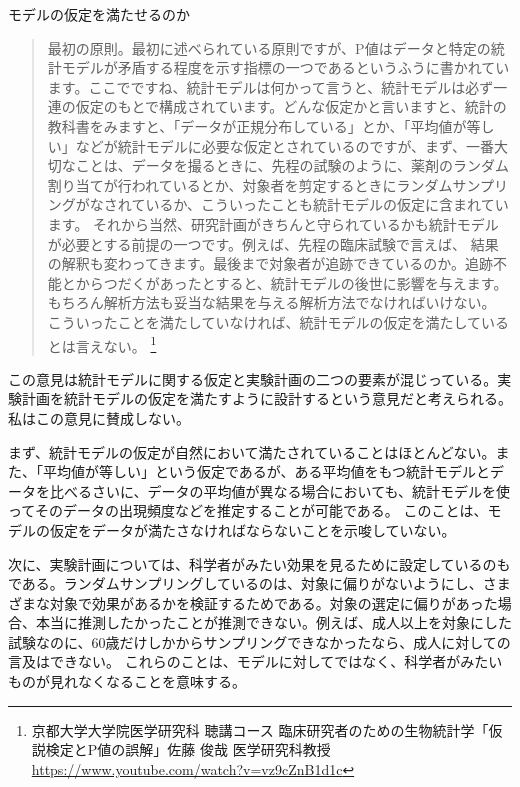 \begin{SMbox}{モデルの仮定を満たせるのか}
    \ 
    \begin{quote}
    最初の原則。最初に述べられている原則ですが、P値はデータと特定の統計モデルが矛盾する程度を示す指標の一つであるというふうに書かれています。ここでですね、統計モデルは何かって言うと、統計モデルは必ず一連の仮定のもとで構成されています。どんな仮定かと言いますと、統計の教科書をみますと、「データが正規分布している」とか、「平均値が等しい」などが統計モデルに必要な仮定とされているのですが、まず、一番大切なことは、データを撮るときに、先程の試験のように、薬剤のランダム割り当てが行われているとか、対象者を剪定するときにランダムサンプリングがなされているか、こういったことも統計モデルの仮定に含まれています。
    それから当然、研究計画がきちんと守られているかも統計モデルが必要とする前提の一つです。例えば、先程の臨床試験で言えば、
    結果の解釈も変わってきます。最後まで対象者が追跡できているのか。追跡不能とからつだくがあったとすると、統計モデルの後世に影響を与えます。もちろん解析方法も妥当な結果を与える解析方法でなければいけない。
    こういったことを満たしていなければ、統計モデルの仮定を満たしているとは言えない。
    \footnote{京都大学大学院医学研究科 聴講コース 臨床研究者のための生物統計学「仮説検定とP値の誤解」佐藤 俊哉 医学研究科教授 \url{https://www.youtube.com/watch?v=vz9cZnB1d1c} }
    \end{quote}

    この意見は統計モデルに関する仮定と実験計画の二つの要素が混じっている。実験計画を統計モデルの仮定を満たすように設計するという意見だと考えられる。
    私はこの意見に賛成しない。

     まず、統計モデルの仮定が自然において満たされていることはほとんどない。また、「平均値が等しい」という仮定であるが、ある平均値をもつ統計モデルとデータを比べるさいに、データの平均値が異なる場合においても、統計モデルを使ってそのデータの出現頻度などを推定することが可能である。
     このことは、モデルの仮定をデータが満たさなければならないことを示唆していない。

     次に、実験計画については、科学者がみたい効果を見るために設定しているのもである。ランダムサンプリングしているのは、対象に偏りがないようにし、さまざまな対象で効果があるかを検証するためである。対象の選定に偏りがあった場合、本当に推測したかったことが推測できない。例えば、成人以上を対象にした試験なのに、60歳だけしかからサンプリングできなかったなら、成人に対しての言及はできない。
     これらのことは、モデルに対してではなく、科学者がみたいものが見れなくなることを意味する。

\end{SMbox}



